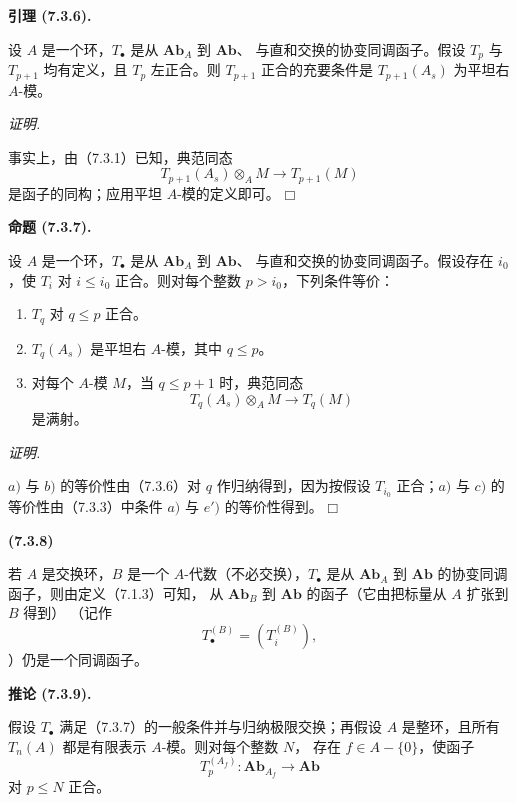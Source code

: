 \documentclass[UTF8,fontset=none,11pt,oneside,openany]{ctexbook}
\providecommand{\square}{\mdlgwhtsquare}
\newenvironment{env}[1][]{%
  \par\medskip\noindent\textbf{(#1)}\ %
}{\par}
\newenvironment{lemma}[1][]{%
  \par\medskip\noindent\textbf{引理 (#1).}\ %
}{\par}
\newenvironment{proposition}[1][]{%
  \par\medskip\noindent\textbf{命题 (#1).}\ %
}{\par}
\newenvironment{corollary}[1][]{%
  \par\medskip\noindent\textbf{推论 (#1).}\ %
}{\par}
\newenvironment{proof}{%
  \par\smallskip\noindent\textit{证明.}\ %
}{\hfill$\square$\par}
\newcommand{\oldpage}[2][]{%
  \hypertarget{ega-source-page-#1-#2}{}%
  \marginnote{\scriptsize\textbf{#1}~|~#2}\ignorespaces}
\begin{document}
\begin{lemma}[7.3.6]
设 $A$ 是一个环，$T_\bullet$ 是从 $\mathbf{Ab}_A$ 到 $\mathbf{Ab}$、
与直和交换的协变同调函子。假设 $T_p$ 与 $T_{p+1}$ 均有定义，且
$T_p$ 左正合。则 $T_{p+1}$ 正合的充要条件是 $T_{p+1}(A_s)$ 为平坦右
$A$-模。
\end{lemma}

\begin{proof}
事实上，由（7.3.1）已知，典范同态
\[
  T_{p+1}(A_s)\otimes_A M\longrightarrow T_{p+1}(M)
\]
是函子的同构；应用平坦 $A$-模的定义即可。
\end{proof}

\begin{proposition}[7.3.7]
设 $A$ 是一个环，$T_\bullet$ 是从 $\mathbf{Ab}_A$ 到 $\mathbf{Ab}$、
与直和交换的协变同调函子。假设存在 $i_0$，使 $T_i$ 对 $i\leq i_0$
正合。则对每个整数 $p>i_0$，下列条件等价：
\begin{enumerate}
  \item[a)] $T_q$ 对 $q\leq p$ 正合。
  \item[b)] $T_q(A_s)$ 是平坦右 $A$-模，其中 $q\leq p$。
  \item[c)] 对每个 $A$-模 $M$，当 $q\leq p+1$ 时，典范同态
    \[
      T_q(A_s)\otimes_A M\longrightarrow T_q(M)
    \]
    是满射。
\end{enumerate}
\end{proposition}

\begin{proof}
$a)$ 与 $b)$ 的等价性由（7.3.6）对 $q$ 作归纳得到，因为按假设
$T_{i_0}$ 正合；$a)$ 与 $c)$ 的等价性由（7.3.3）中条件 $a)$ 与
$e')$ 的等价性得到。
\end{proof}

\oldpage[III]{184}

\begin{env}[7.3.8]
若 $A$ 是交换环，$B$ 是一个 $A$-代数（不必交换），$T_\bullet$ 是从
$\mathbf{Ab}_A$ 到 $\mathbf{Ab}$ 的协变同调函子，则由定义（7.1.3）可知，
从 $\mathbf{Ab}_B$ 到 $\mathbf{Ab}$ 的函子（它由把标量从 $A$ 扩张到
$B$ 得到）
（记作
\[
  T_\bullet^{(B)}=(T_i^{(B)}),
\]
）仍是一个同调函子。
\end{env}

\begin{corollary}[7.3.9]
假设 $T_\bullet$ 满足（7.3.7）的一般条件并与归纳极限交换；再假设
$A$ 是整环，且所有 $T_n(A)$ 都是有限表示 $A$-模。则对每个整数 $N$，
存在 $f\in A-\{0\}$，使函子
\[
  T_p^{(A_f)}:\mathbf{Ab}_{A_f}\longrightarrow\mathbf{Ab}
\]
对 $p\leq N$ 正合。
\end{corollary}
\end{document}

